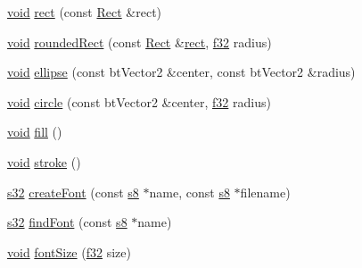 \begin{DoxyCompactItemize}
\item 
\mbox{\hyperlink{_thread_8h_af1e856da2e658414cb2456cb6f7ebc66}{void}} \mbox{\hyperlink{classnjli_1_1_world_h_u_d_a4183aaaf55fabccdf9d1f9b7614f02a4}{rect}} (const \mbox{\hyperlink{classnjli_1_1_rect}{Rect}} \&rect)
\item 
\mbox{\hyperlink{_thread_8h_af1e856da2e658414cb2456cb6f7ebc66}{void}} \mbox{\hyperlink{classnjli_1_1_world_h_u_d_a30d1f93d6d2fe68ccf1bb1ce56e279c8}{rounded\+Rect}} (const \mbox{\hyperlink{classnjli_1_1_rect}{Rect}} \&\mbox{\hyperlink{classnjli_1_1_world_h_u_d_a4183aaaf55fabccdf9d1f9b7614f02a4}{rect}}, \mbox{\hyperlink{_util_8h_a5f6906312a689f27d70e9d086649d3fd}{f32}} radius)
\item 
\mbox{\hyperlink{_thread_8h_af1e856da2e658414cb2456cb6f7ebc66}{void}} \mbox{\hyperlink{classnjli_1_1_world_h_u_d_af1b141d1009fc9a9c8de94c4709edf65}{ellipse}} (const bt\+Vector2 \&center, const bt\+Vector2 \&radius)
\item 
\mbox{\hyperlink{_thread_8h_af1e856da2e658414cb2456cb6f7ebc66}{void}} \mbox{\hyperlink{classnjli_1_1_world_h_u_d_a3170986b281a79fc800322102ab17f51}{circle}} (const bt\+Vector2 \&center, \mbox{\hyperlink{_util_8h_a5f6906312a689f27d70e9d086649d3fd}{f32}} radius)
\item 
\mbox{\hyperlink{_thread_8h_af1e856da2e658414cb2456cb6f7ebc66}{void}} \mbox{\hyperlink{classnjli_1_1_world_h_u_d_a14544b181d0c45c47843a562ed4b029a}{fill}} ()
\item 
\mbox{\hyperlink{_thread_8h_af1e856da2e658414cb2456cb6f7ebc66}{void}} \mbox{\hyperlink{classnjli_1_1_world_h_u_d_ae4774f72db77fef1dbf4c6b7adc2e357}{stroke}} ()
\item 
\mbox{\hyperlink{_util_8h_aa62c75d314a0d1f37f79c4b73b2292e2}{s32}} \mbox{\hyperlink{classnjli_1_1_world_h_u_d_a06b9f9f91b0a3429f728a9064dd5e2c7}{create\+Font}} (const \mbox{\hyperlink{_util_8h_a2ff401e087cf786c38a6812723e94473}{s8}} $\ast$name, const \mbox{\hyperlink{_util_8h_a2ff401e087cf786c38a6812723e94473}{s8}} $\ast$filename)
\item 
\mbox{\hyperlink{_util_8h_aa62c75d314a0d1f37f79c4b73b2292e2}{s32}} \mbox{\hyperlink{classnjli_1_1_world_h_u_d_a5e016ba34d85a2bbdba535129d4fdc6a}{find\+Font}} (const \mbox{\hyperlink{_util_8h_a2ff401e087cf786c38a6812723e94473}{s8}} $\ast$name)
\item 
\mbox{\hyperlink{_thread_8h_af1e856da2e658414cb2456cb6f7ebc66}{void}} \mbox{\hyperlink{classnjli_1_1_world_h_u_d_ac51e71d915cdf53232247d7786fa883c}{font\+Size}} (\mbox{\hyperlink{_util_8h_a5f6906312a689f27d70e9d086649d3fd}{f32}} size)

\end{DoxyCompactItemize}
